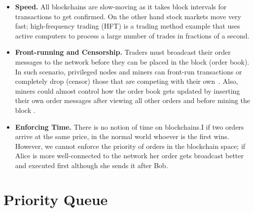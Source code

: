 \begin{itemize}

\item \textbf{Speed.} All blockchains are slow-moving as it takes block intervals for transactions to get confirmed. On the other hand stock markets move very fast;  high-frequency trading (HFT) is a trading method example that uses active computers to process a large number of trades in fractions of a second. 


\item \textbf{Front-running and Censorship.} Traders must broadcast their order messages to the network before they can be placed in the block (\ie order book). In such scenario, privileged nodes and miners can front-run transactions or completely drop (censor) those that are competing with their own~\cite{eskandari2019sok}. Also, miners could almost control how the order book gets updated by inserting their own order messages after viewing all other orders and before mining the block .


\item \textbf{Enforcing Time.} There is no notion of time on blockchains.I if two orders arrive at the same price, in the normal world whoever is the first wins. However, we cannot enforce the priority of orders in the blockchain space; if Alice is more well-connected to the network her order gets broadcast better and executed first although she sends it after Bob. 

\end{itemize}



\section{Priority Queue}\label{sec:pq}

